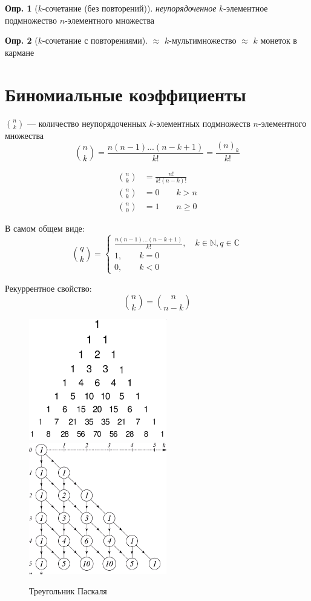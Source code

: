 \documentclass[a4paper,12pt]{article}
\numberwithin{figure}{section}
\theoremstyle{definition}
\newtheorem{definition}{Опр.}[section]
\theoremstyle{definition}
\begin{document}
\begin{definition}[$k$-сочетание (без повторений)]
	\textit{неупорядоченное} $k$-элементное подмножество $n$-элементного множества
\end{definition}

\begin{definition}[$k$-сочетание с повторениями]
	$\approx$ $k$-мультимножество $\approx$ $k$ монеток в кармане
\end{definition}



\section{Биномиальные коэффициенты}

$\binom{n}{k}$ --- количество неупорядоченных $k$-элементных подмножеств $n$-элементного множества
	\[ \binom{n}{k} = \frac{n(n-1)...(n-k+1)}{k!} = \frac{(n)_k}{k!} \]


\begin{align*}
	\binom{n}{k} &= \frac{n!}{k!(n-k)!} \\
	\binom{n}{k} &= 0 \qquad k > n \\
	\binom{n}{0} &= 1 \qquad n \geqslant 0
\end{align*}

В самом общем виде:
	\[ \binom{q}{k} = \begin{cases*}
		\frac{n(n-1)...(n-k+1)}{k!}, \quad k \in \mathbb{N}, q \in \mathbb{C} \\
		1,  \qquad k=0 \\
		0,  \qquad k<0
	\end{cases*} \]

Рекуррентное свойство:
\[ \binom{n}{k} = \binom{n}{n-k} \]

\begin{figure}[H]
	\centering
	\includegraphics[width=6cm]{pascal-triangle.png}
	\hspace{1cm}
	\includegraphics[width=6cm]{pascal-triangle-2.png}
	\caption{Треугольник Паскаля}
\end{figure}
\end{document}
